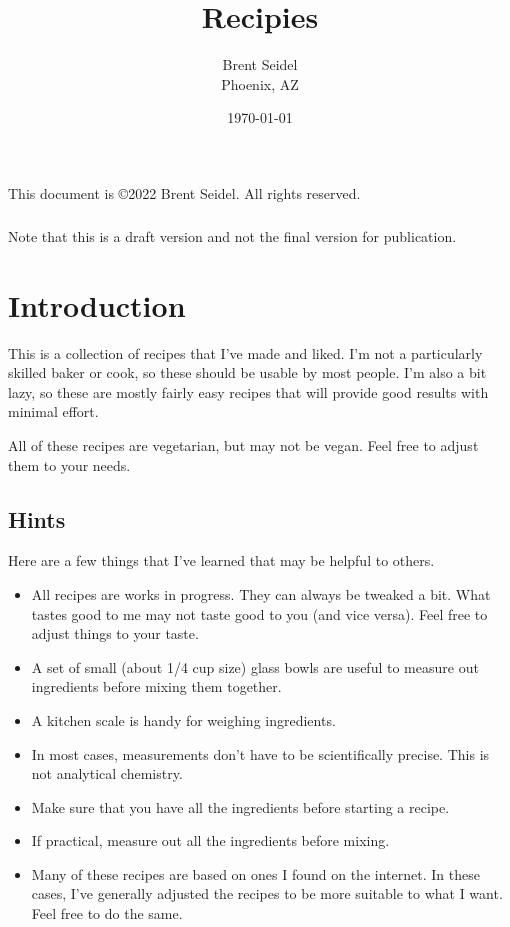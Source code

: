 \documentclass[10pt, openany]{book}
\title{Recipies}
\author{Brent Seidel \\ Phoenix, AZ}
\date{ \today }
\begin{document}
%
%
\frontmatter
\maketitle
\begin{center}
This document is \copyright 2022 Brent Seidel.  All rights reserved.

\paragraph{}Note that this is a draft version and not the final version for publication.
\end{center}
\tableofcontents

\mainmatter

\chapter{Introduction}
This is a collection of recipes that I've made and liked.  I'm not a particularly skilled baker or cook, so these should be usable by most people.  I'm also a bit lazy, so these are mostly fairly easy recipes that will provide good results with minimal effort.

All of these recipes are vegetarian, but may not be vegan.  Feel free to adjust them to your needs.

\section{Hints}
Here are a few things that I've learned that may be helpful to others.
\begin{itemize}
  \item All recipes are works in progress.  They can always be tweaked a bit.  What tastes good to me may not taste good to you (and vice versa).  Feel free to adjust things to your taste.
  \item A set of small (about 1/4 cup size) glass bowls are useful to measure out ingredients before mixing them together.
  \item A kitchen scale is handy for weighing ingredients.
  \item In most cases, measurements don't have to be scientifically precise.  This is not analytical chemistry.
  \item Make sure that you have all the ingredients before starting a recipe.
  \item If practical, measure out all the ingredients before mixing.
  \item Many of these recipes are based on ones I found on the internet.  In these cases, I've generally adjusted the recipes to be more suitable to what I want.  Feel free to do the same.
\end{itemize}
\end{document}
